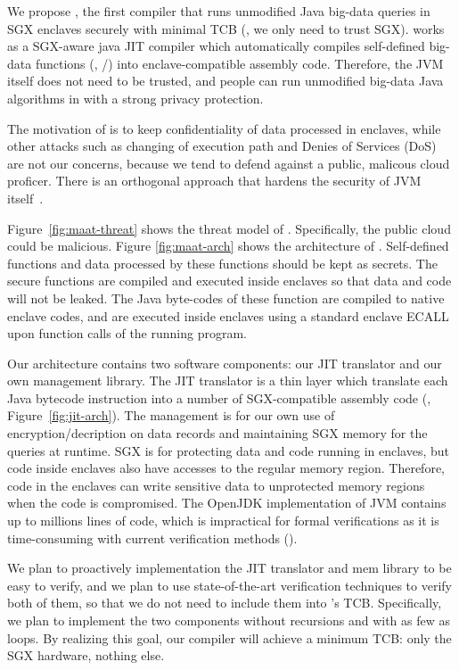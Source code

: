 We propose \maat, the first compiler that runs unmodified Java big-data queries 
in SGX enclaves securely with minimal TCB (\ie, we only need to trust SGX). 
\maat works as a SGX-aware java JIT compiler which automatically compiles 
self-defined big-data functions (\eg, /) into 
enclave-compatible assembly code. Therefore, the JVM itself does not need to be 
trusted, and people can run unmodified big-data Java algorithms in \maat with a 
strong privacy protection.

The motivation of \maat is to keep confidentiality of data processed in 
enclaves, while other attacks such as changing of execution path and Denies of 
Services (DoS) are not our concerns, because we tend to defend against a 
public, malicous cloud proficer. There is an orthogonal approach that hardens 
the security of JVM itself~\cite{jitguard:ccs17}.

Figure~\ref{fig:maat-threat} shows the threat model of \maat. Specifically, the 
public cloud could be malicious. Figure \ref{fig:maat-arch} shows the 
architecture of \maat. Self-defined functions and data processed by these 
functions should be kept as secrets. The secure functions are compiled and 
executed inside enclaves so that data and code will not be leaked. The Java 
byte-codes of these function are compiled to native enclave codes, and are 
executed inside enclaves using a standard enclave ECALL upon function calls of 
the running program.

Our \maat architecture contains two software components: our JIT translator 
and our own management library. The JIT translator is a thin layer which 
translate each Java bytecode instruction into a number of SGX-compatible 
assembly code (\eg, Figure~\ref{fig:jit-arch}). The management is for our own 
use of encryption/decription on data records and maintaining SGX memory for the 
queries at runtime. SGX is for protecting data and code running in enclaves, but 
code inside 
enclaves also have accesses to the regular memory region. Therefore, code in 
the enclaves can write sensitive data to unprotected memory regions when the 
code is compromised. The OpenJDK implementation of JVM contains up to millions 
lines of code, which is impractical for formal verifications as it is 
time-consuming with current verification methods ().

We plan to proactively 
implementation the JIT translator and mem library to be easy to verify, and we 
plan to use state-of-the-art verification techniques to verify both of them, so 
that we do not need to include them into \maat's TCB. Specifically, we plan to 
implement the two components without recursions and with as few as loops. By 
realizing this goal, our \maat compiler will achieve a minimum TCB: only the SGX 
hardware, nothing else.


